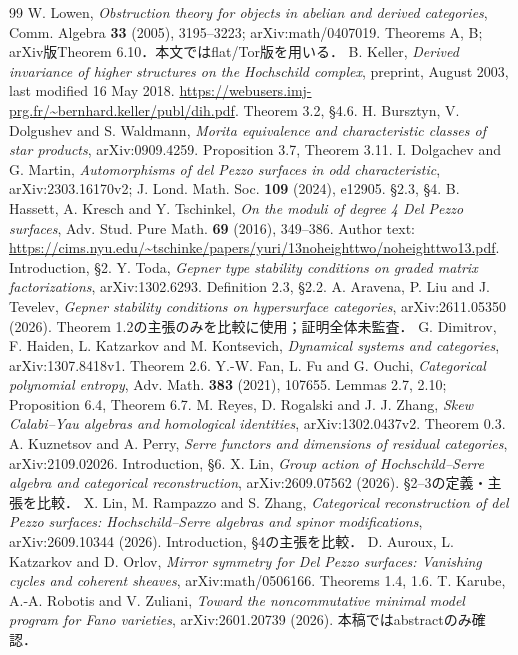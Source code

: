 \documentclass[11pt,a4paper]{ltjsarticle}
\begin{document}
\begin{thebibliography}{99}
 W. Lowen, \emph{Obstruction theory for objects in abelian and derived categories}, Comm. Algebra \textbf{33} (2005), 3195--3223; arXiv:math/0407019. Theorems A, B; arXiv版Theorem 6.10．本文ではflat/Tor版を用いる．
 B. Keller, \emph{Derived invariance of higher structures on the Hochschild complex}, preprint, August 2003, last modified 16 May 2018. \url{https://webusers.imj-prg.fr/~bernhard.keller/publ/dih.pdf}. Theorem 3.2, \S4.6.
 H. Bursztyn, V. Dolgushev and S. Waldmann, \emph{Morita equivalence and characteristic classes of star products}, arXiv:0909.4259. Proposition 3.7, Theorem 3.11.
 I. Dolgachev and G. Martin, \emph{Automorphisms of del Pezzo surfaces in odd characteristic}, arXiv:2303.16170v2; J. Lond. Math. Soc. \textbf{109} (2024), e12905. \S2.3, \S4.
 B. Hassett, A. Kresch and Y. Tschinkel, \emph{On the moduli of degree 4 Del Pezzo surfaces}, Adv. Stud. Pure Math. \textbf{69} (2016), 349--386. Author text: \url{https://cims.nyu.edu/~tschinke/papers/yuri/13noheighttwo/noheighttwo13.pdf}. Introduction, \S2.
 Y. Toda, \emph{Gepner type stability conditions on graded matrix factorizations}, arXiv:1302.6293. Definition 2.3, \S2.2.
 A. Aravena, P. Liu and J. Tevelev, \emph{Gepner stability conditions on hypersurface categories}, arXiv:2611.05350 (2026). Theorem 1.2の主張のみを比較に使用；証明全体未監査．
 G. Dimitrov, F. Haiden, L. Katzarkov and M. Kontsevich, \emph{Dynamical systems and categories}, arXiv:1307.8418v1. Theorem 2.6.
 Y.-W. Fan, L. Fu and G. Ouchi, \emph{Categorical polynomial entropy}, Adv. Math. \textbf{383} (2021), 107655. Lemmas 2.7, 2.10; Proposition 6.4, Theorem 6.7.
 M. Reyes, D. Rogalski and J. J. Zhang, \emph{Skew Calabi--Yau algebras and homological identities}, arXiv:1302.0437v2. Theorem 0.3.
 A. Kuznetsov and A. Perry, \emph{Serre functors and dimensions of residual categories}, arXiv:2109.02026. Introduction, \S6.
 X. Lin, \emph{Group action of Hochschild--Serre algebra and categorical reconstruction}, arXiv:2609.07562 (2026). \S2--3の定義・主張を比較．
 X. Lin, M. Rampazzo and S. Zhang, \emph{Categorical reconstruction of del Pezzo surfaces: Hochschild--Serre algebras and spinor modifications}, arXiv:2609.10344 (2026). Introduction, \S4の主張を比較．
 D. Auroux, L. Katzarkov and D. Orlov, \emph{Mirror symmetry for Del Pezzo surfaces: Vanishing cycles and coherent sheaves}, arXiv:math/0506166. Theorems 1.4, 1.6.
 T. Karube, A.-A. Robotis and V. Zuliani, \emph{Toward the noncommutative minimal model program for Fano varieties}, arXiv:2601.20739 (2026). 本稿ではabstractのみ確認．

\end{thebibliography}
\end{document}
